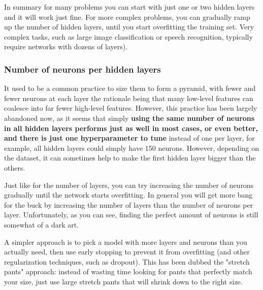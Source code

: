 \documentclass[12pt, letterpaper]{article}
\theoremstyle{definition}
\let\tb\textbf
\begin{document}
In summary for many problems you can start with just one or two hidden layers and it will work just fine. For more complex problems, you can gradually ramp up the number of hidden layers, until you start overfitting the training set. Very complex tasks, such as large image classification or speech recognition, typically require networks with dozens of layers).

\subsubsection{Number of neurons per hidden layers}
It used to be a common practice to size them to form a pyramid, with fewer and fewer neurons at each layer the rationale being that many low-level features can coalesce into far fewer high-level features. However, this practice has been largely abandoned now, as it seems that simply \tb{using the same number of neurons in all hidden layers performs just as well in most cases, or even better, and there is just one hyperparameter to tune} instead of one per layer, for example, all hidden layers could simply have 150 neurons. However, depending on the dataset, it can sometimes help to make the first hidden layer bigger than the others.

Just like for the number of layers, you can try increasing the number of neurons gradually until the network starts overfitting. In general you will get more bang for the buck by increasing the number of layers than the number of neurons per layer. Unfortunately, as you can see, finding the perfect amount of neurons is still somewhat of a dark art.

A simpler approach is to pick a model with more layers and neurons than you actually need, then use early stopping to prevent it from overfitting (and other regularization techniques, such as dropout). This has been dubbed the "stretch pants" approach: instead of wasting time looking for pants that perfectly match your size, just use large stretch pants that will shrink down to the right size.
\end{document}

